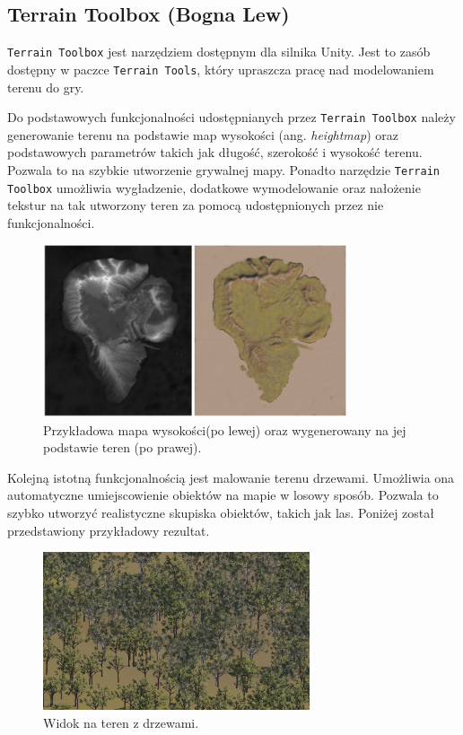 \subsection{Terrain Toolbox (Bogna Lew)}\label{ss:tTool}
\texttt{Terrain Toolbox} jest narzędziem dostępnym dla silnika Unity. Jest to zasób dostępny w paczce \texttt{Terrain Tools}, który
upraszcza pracę nad modelowaniem terenu do gry.

Do podstawowych funkcjonalności udostępnianych przez \texttt{Terrain Toolbox} należy generowanie terenu na podstawie
map wysokości (ang. \textit{heightmap}) oraz podstawowych parametrów takich jak długość, szerokość i wysokość terenu.
Pozwala to na szybkie utworzenie grywalnej mapy. Ponadto narzędzie \texttt{Terrain Toolbox} umożliwia wygładzenie, dodatkowe
wymodelowanie oraz nałożenie tekstur na tak utworzony teren za pomocą udostępnionych przez nie funkcjonalności.

\begin{figure}[h!]
    \centering
    \includegraphics[width=0.8\textwidth]{images/modelowanie_terenu/przykladowe_heightmapy.jpg}
    \caption[Przykładowa mapa wysokości (po lewej) oraz wygenerowany na jej podstawie teren (po prawej).]{Przykładowa mapa wysokości\protect\footnotemark (po lewej) oraz wygenerowany na jej podstawie teren (po prawej).}
\end{figure}

Kolejną istotną funkcjonalnością jest malowanie terenu drzewami. Umożliwia ona automatyczne umiejscowienie obiektów na
mapie w losowy sposób. Pozwala to szybko utworzyć realistyczne skupiska obiektów, takich jak las. Poniżej
został przedstawiony przykładowy rezultat.

\begin{figure}[h!]
    \centering
    \includegraphics[width=0.7\textwidth]{images/modelowanie_terenu/drzewa.jpg}
    \caption{Widok na teren z drzewami.}
\end{figure}
\FloatBarrier
